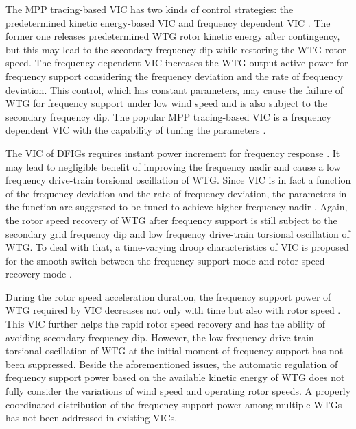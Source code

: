 \documentclass[journal]{IEEEtran}
\begin{document}
The MPP tracing-based VIC has two kinds of control strategies: the predetermined kinetic energy-based VIC \cite{Ullah2008Temporary, Itani2011Short} and frequency dependent VIC \cite{Morren2006Inertial, Morren2006Wind, Margaris2012Frequency, Min2016Dynamic}. The former one releases predetermined WTG rotor kinetic energy after contingency, but this may lead to the secondary frequency dip while restoring the WTG rotor speed. The frequency dependent VIC increases the WTG output active power for frequency support considering the frequency deviation and the rate of frequency deviation. This control, which has constant parameters, may cause the failure of WTG for frequency support under low wind speed and is also subject to the secondary frequency dip.  The popular MPP tracing-based VIC is a frequency dependent VIC with the capability of tuning the parameters \cite{Morren2006Wind, Kayikci2009Dynamic}. 

The VIC of DFIGs requires instant power increment for frequency response \cite{Kang2016Stable}. It may lead to negligible benefit of improving the frequency nadir and cause a low frequency drive-train torsional oscillation of WTG. Since VIC is in fact a function of the frequency deviation and the rate of frequency deviation, the parameters in the function are suggested to be tuned to achieve higher frequency nadir \cite{Vyver2016Droop}. Again, the rotor speed recovery of WTG after frequency support is still subject to the secondary grid frequency dip and low frequency drive-train torsional oscillation of WTG. To deal with that, a time-varying droop characteristics of VIC is proposed for the smooth switch between the frequency support mode and rotor speed recovery mode \cite{Garmroodi2017Frequency}. 

During the rotor speed acceleration duration, the frequency support power of WTG required by VIC decreases not only with time but also with rotor speed \cite{Yang2018Temporary}. This VIC further helps the rapid rotor speed recovery and has the ability of avoiding secondary frequency dip. However, the low frequency drive-train torsional oscillation of WTG at the initial moment of frequency support has not been suppressed. Beside the aforementioned issues, the automatic regulation of frequency support power based on the available kinetic energy of WTG does not fully consider the variations of wind speed and operating rotor speeds. A properly coordinated distribution of the frequency support power among multiple WTGs has not been addressed in existing VICs.
\end{document}
